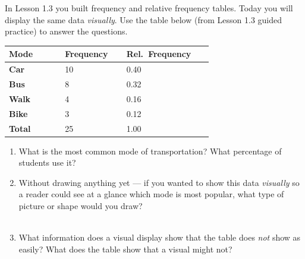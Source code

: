 \documentclass[10pt]{article}
\begin{document}
\namedateperiod

\vspace{0.18in}

\noindent In Lesson 1.3 you built frequency and relative frequency tables.
Today you will display the same data \textit{visually}. Use the table below
(from Lesson 1.3 guided practice) to answer the questions.

\vspace{0.1in}

\begin{center}
\small
\renewcommand{\arraystretch}{1.8}
\begin{tabularx}{0.72\linewidth}{@{} >{\bfseries}p{0.22\linewidth}
                                        C{0.2\linewidth}
                                        C{0.26\linewidth} @{}}
\textbf{Mode} & \textbf{Frequency} & \textbf{Rel.\ Frequency} \\
\midrule
Car  & 10 & 0.40 \\
Bus  & 8  & 0.32 \\
Walk & 4  & 0.16 \\
Bike & 3  & 0.12 \\
\midrule
{}\textbf{Total} & 25 & 1.00 \\
\end{tabularx}
\end{center}

\vspace{0.18in}

\begin{enumerate}

  \item What is the most common mode of transportation?
        What percentage of students use it?\\[6pt]
        \writeline

  \item Without drawing anything yet --- if you wanted to show this data
        \textit{visually} so a reader could see at a glance which mode is most
        popular, what type of picture or shape would you draw?\\[6pt]
        \writeline\\[1pt]\writeline

  \item What information does a visual display show that the table does \textit{not}
        show as easily? What does the table show that a visual might not?\\[6pt]
        \writeline\\[1pt]\writeline

\end{enumerate}
\end{document}
